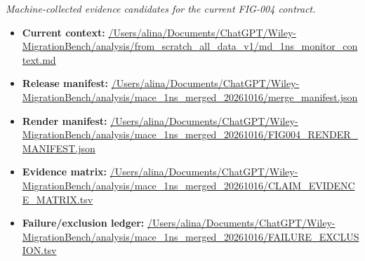 \emph{Machine-collected evidence candidates for the current FIG-004 contract.}
\begin{itemize}[leftmargin=1.4em,noitemsep]
\item \textbf{Current context:} \url{/Users/alina/Documents/ChatGPT/Wiley-MigrationBench/analysis/from_scratch_all_data_v1/md_1ns_monitor_context.md}
\item \textbf{Release manifest:} \url{/Users/alina/Documents/ChatGPT/Wiley-MigrationBench/analysis/mace_1ns_merged_20261016/merge_manifest.json}
\item \textbf{Render manifest:} \url{/Users/alina/Documents/ChatGPT/Wiley-MigrationBench/analysis/mace_1ns_merged_20261016/FIG004_RENDER_MANIFEST.json}
\item \textbf{Evidence matrix:} \url{/Users/alina/Documents/ChatGPT/Wiley-MigrationBench/analysis/mace_1ns_merged_20261016/CLAIM_EVIDENCE_MATRIX.tsv}
\item \textbf{Failure/exclusion ledger:} \url{/Users/alina/Documents/ChatGPT/Wiley-MigrationBench/analysis/mace_1ns_merged_20261016/FAILURE_EXCLUSION.tsv}
\end{itemize}
